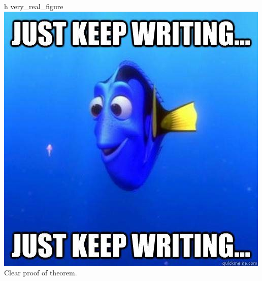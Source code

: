 \namedfigure
{h}
{very_real_figure}
{\includegraphics[width=\textwidth]{resources/images/very_important_image.jpg}}
{Clear proof of theorem.}
